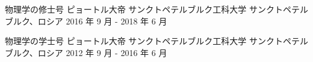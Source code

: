 

\begin{cventries}

  \cventry
    {物理学の修士号} %
    {ピョートル大帝 サンクトペテルブルク工科大学} %
    {サンクトペテルブルク、ロシア} %
    {2016 年 9 月 - 2018 年 6 月} %
    {}

  \cventry
    {物理学の学士号} %
    {ピョートル大帝 サンクトペテルブルク工科大学} %
    {サンクトペテルブルク、ロシア} %
    {2012 年 9 月 - 2016 年 6 月} %
    {}

\end{cventries}